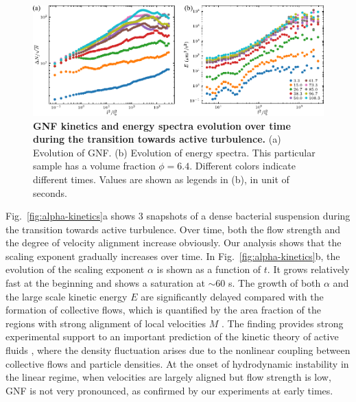 \begin{figure}[h]
\begin{center}
\includegraphics[width=5.5in]{figs/5-GNF/8.pdf}
\caption[GNF kinetics and energy spectra evolution over time during the transition towards active turbulence]
{
\textbf{GNF kinetics and energy spectra evolution over time during the transition towards active turbulence.} (a) Evolution of GNF. (b) Evolution of energy spectra. This particular sample has a volume fraction $\phi=6.4$. Different colors indicate different times. Values are shown as legends in (b), in unit of seconds.
}
\label{fig:GNF-energy-spectra-kinetics}
\end{center}
\end{figure}

Fig.~\ref{fig:alpha-kinetics}a shows 3 snapshots of a dense bacterial suspension during the transition towards active turbulence. Over time, both the flow strength and the degree of velocity alignment increase obviously. Our analysis shows that the scaling exponent gradually increases over time.
In Fig.~\ref{fig:alpha-kinetics}b, the evolution of the scaling exponent $\alpha$ is shown as a function of $t$. It grows relatively fast at the beginning and shows a saturation at $\sim 60$ s. The growth of both $\alpha$ and the large scale kinetic energy $E$ are significantly delayed compared with the formation of collective flows, which is quantified by the area fraction of the regions with strong alignment of local velocities $M$ \cite{Peng2020}.
The finding provides strong experimental support to an important prediction of the kinetic theory of active fluids \cite{Saintillan2008a,Saintillan2008b}, where the density fluctuation arises due to the nonlinear coupling between collective flows and particle densities. At the onset of hydrodynamic instability in the linear regime, when velocities are largely aligned but flow strength is low, GNF is not very pronounced, as confirmed by our experiments at early times.

